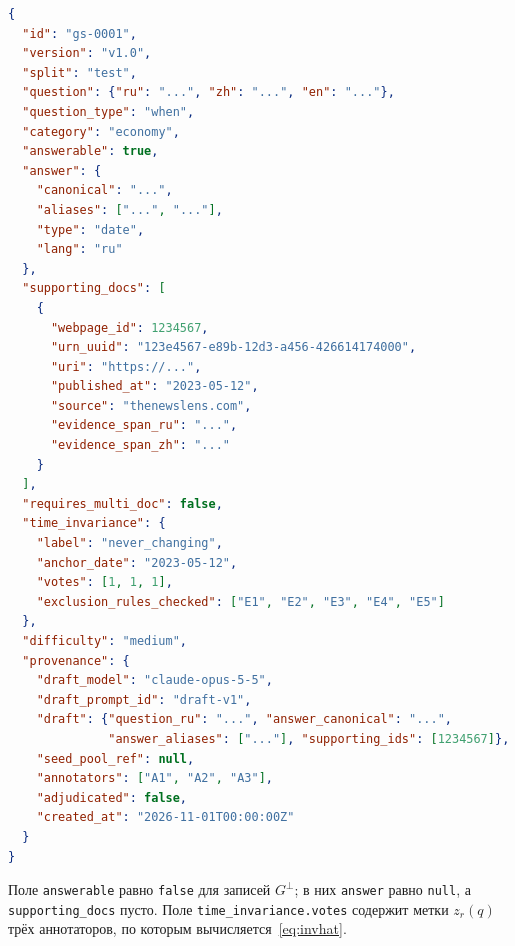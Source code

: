 \documentclass{article}
\newcommand{\refuse}{\bot}                          %
\begin{document}
\begin{lstlisting}[language=json]
{
  "id": "gs-0001",
  "version": "v1.0",
  "split": "test",
  "question": {"ru": "...", "zh": "...", "en": "..."},
  "question_type": "when",
  "category": "economy",
  "answerable": true,
  "answer": {
    "canonical": "...",
    "aliases": ["...", "..."],
    "type": "date",
    "lang": "ru"
  },
  "supporting_docs": [
    {
      "webpage_id": 1234567,
      "urn_uuid": "123e4567-e89b-12d3-a456-426614174000",
      "uri": "https://...",
      "published_at": "2023-05-12",
      "source": "thenewslens.com",
      "evidence_span_ru": "...",
      "evidence_span_zh": "..."
    }
  ],
  "requires_multi_doc": false,
  "time_invariance": {
    "label": "never_changing",
    "anchor_date": "2023-05-12",
    "votes": [1, 1, 1],
    "exclusion_rules_checked": ["E1", "E2", "E3", "E4", "E5"]
  },
  "difficulty": "medium",
  "provenance": {
    "draft_model": "claude-opus-5-5",
    "draft_prompt_id": "draft-v1",
    "draft": {"question_ru": "...", "answer_canonical": "...",
              "answer_aliases": ["..."], "supporting_ids": [1234567]},
    "seed_pool_ref": null,
    "annotators": ["A1", "A2", "A3"],
    "adjudicated": false,
    "created_at": "2026-11-01T00:00:00Z"
  }
}
\end{lstlisting}

Поле \texttt{answerable} равно \texttt{false} для записей $G^{\refuse}$; в них \texttt{answer} равно \texttt{null}, а \texttt{supporting\_docs} пусто. Поле \texttt{time\_invariance.votes} содержит метки $z_r(q)$ трёх аннотаторов, по которым вычисляется~\eqref{eq:invhat}.
\end{document}
